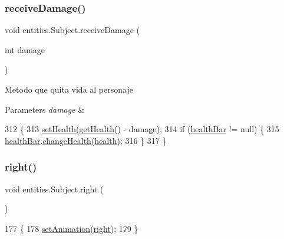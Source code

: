 \subsubsection{\texorpdfstring{receive\+Damage()}{receiveDamage()}}
{\footnotesize\ttfamily void entities.\+Subject.\+receive\+Damage (\begin{DoxyParamCaption}\item[{int}]{damage }\end{DoxyParamCaption})\hspace{0.3cm}{\ttfamily [inline]}}

Metodo que quita vida al personaje


\begin{DoxyParams}{Parameters}
{\em damage} & \\
\hline
\end{DoxyParams}

\begin{DoxyCode}
312                                           \{
313         \mbox{\hyperlink{classentities_1_1_subject_ac5ff99e7167f6b979e9d63cedbc8c9ba}{setHealth}}(\mbox{\hyperlink{classentities_1_1_subject_a5876631b4eb906fe9e1b51dd94a849e4}{getHealth}}() - damage);
314         \textcolor{keywordflow}{if} (\mbox{\hyperlink{classentities_1_1_subject_a3b3d023ad2be3c1de4b8d8de98556b3c}{healthBar}} != null) \{
315             \mbox{\hyperlink{classentities_1_1_subject_a3b3d023ad2be3c1de4b8d8de98556b3c}{healthBar}}.\mbox{\hyperlink{classgui_1_1_health_bar_a4e51c8bf35eb0db3d98f2bad5d236890}{changeHealth}}(\mbox{\hyperlink{classentities_1_1_subject_a8285660fdae3f0b220bbc686cf5c012c}{health}});
316         \}
317     \}
\end{DoxyCode}
\mbox{\label{classentities_1_1_subject_a6a1ee4276efe4d5cc885288de3a812b0}} 
\subsubsection{\texorpdfstring{right()}{right()}}
{\footnotesize\ttfamily void entities.\+Subject.\+right (\begin{DoxyParamCaption}{ }\end{DoxyParamCaption})\hspace{0.3cm}{\ttfamily [inline]}}


\begin{DoxyCode}
177                         \{
178         \mbox{\hyperlink{classentities_1_1_animated_sprite_entity_a089bd746df0d8a9d5687240bb34af2dc}{setAnimation}}(\mbox{\hyperlink{classentities_1_1_subject_a6a1ee4276efe4d5cc885288de3a812b0}{right}});
179     \}
\end{DoxyCode}
\mbox{\label{classentities_1_1_subject_a6dcac47e937685e8021165e08289784a}} 
